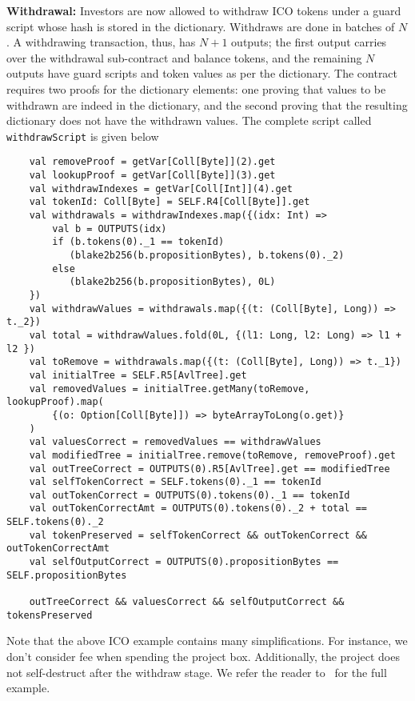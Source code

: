 \documentclass[runningheads]{llncs}
\begin{document}
\textbf{Withdrawal:}
Investors are now allowed to withdraw ICO tokens under a guard script whose hash is stored in the dictionary. Withdraws are done in batches of $N$. A withdrawing transaction, thus, has $N + 1$ outputs; the first output carries over the withdrawal sub-contract and balance tokens, and the remaining $N$ outputs have guard scripts and token values as per the dictionary. The contract requires two proofs for the dictionary elements: one proving that values to be withdrawn are indeed in the dictionary, and the second proving that the resulting dictionary does not have the withdrawn values. The complete script called \texttt{withdrawScript} is given below
\small{
	\begin{verbatim}
	val removeProof = getVar[Coll[Byte]](2).get
	val lookupProof = getVar[Coll[Byte]](3).get
	val withdrawIndexes = getVar[Coll[Int]](4).get
	val tokenId: Coll[Byte] = SELF.R4[Coll[Byte]].get
	val withdrawals = withdrawIndexes.map({(idx: Int) =>
	    val b = OUTPUTS(idx)
	    if (b.tokens(0)._1 == tokenId) 
	       (blake2b256(b.propositionBytes), b.tokens(0)._2)
	    else 
	       (blake2b256(b.propositionBytes), 0L)
	})
	val withdrawValues = withdrawals.map({(t: (Coll[Byte], Long)) => t._2})
	val total = withdrawValues.fold(0L, {(l1: Long, l2: Long) => l1 + l2 })
	val toRemove = withdrawals.map({(t: (Coll[Byte], Long)) => t._1})
	val initialTree = SELF.R5[AvlTree].get
	val removedValues = initialTree.getMany(toRemove, lookupProof).map(
	    {(o: Option[Coll[Byte]]) => byteArrayToLong(o.get)}
	)
	val valuesCorrect = removedValues == withdrawValues
	val modifiedTree = initialTree.remove(toRemove, removeProof).get
	val outTreeCorrect = OUTPUTS(0).R5[AvlTree].get == modifiedTree
	val selfTokenCorrect = SELF.tokens(0)._1 == tokenId
	val outTokenCorrect = OUTPUTS(0).tokens(0)._1 == tokenId
	val outTokenCorrectAmt = OUTPUTS(0).tokens(0)._2 + total == SELF.tokens(0)._2
	val tokenPreserved = selfTokenCorrect && outTokenCorrect && outTokenCorrectAmt
	val selfOutputCorrect = OUTPUTS(0).propositionBytes == SELF.propositionBytes
	
	outTreeCorrect && valuesCorrect && selfOutputCorrect && tokensPreserved
	\end{verbatim}
}

Note that the above ICO example contains many simplifications. For instance, we don't consider fee when spending the project box. Additionally, the project does not self-destruct after the withdraw stage. We refer the reader to~\cite{ico-blog} for the full example.
\end{document}
